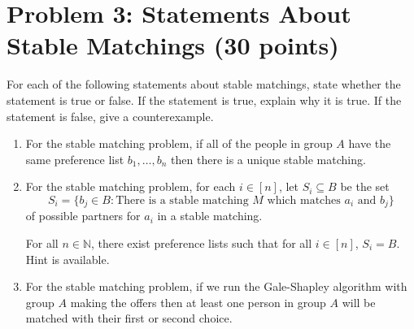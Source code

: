 \documentclass[12pt]{article}
\begin{document}
\section*{Problem 3: Statements About Stable Matchings (30 points)}
For each of the following statements about stable matchings, state whether the statement is true or false. If the statement is true, explain why it is true. If the statement is false, give a counterexample.
\begin{enumerate}
\item [(a)] For the stable matching problem, if all of the people in group $A$ have the same preference list $b_1,\ldots,b_n$ then there is a unique stable matching.
\item [(b)] For the stable matching problem, for each $i \in [n]$, let $S_i \subseteq B$ be the set 
\[
S_i = \{b_j \in B: \text{There is a stable matching } M \text{ which matches } a_i \text{ and } b_j\}
\]
of possible partners for $a_i$ in a stable matching.

For all $n \in \mathbb{N}$, there exist preference lists such that for all $i \in [n]$, $S_i = B$. Hint is available.
\item [(c)] For the stable matching problem, if we run the Gale-Shapley algorithm with group $A$ making the offers then at least one person in group $A$ will be matched with their first or second choice.
\end{enumerate}
\end{document}
